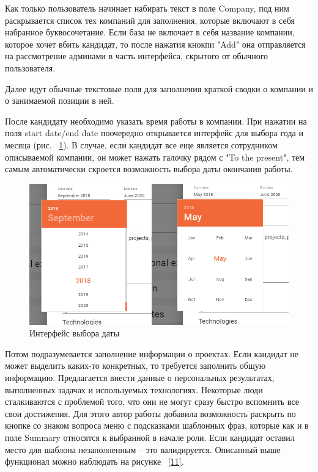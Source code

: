 \documentclass[14pt, a4paper]{diplom}
\begin{document}
Как только пользователь начинает набирать текст в поле Company, под ним раскрывается список тех компаний для заполнения, которые включают в себя набранное буквосочетание.
Если база не включает в себя название компании, которое хочет вбить кандидат, то после нажатия кнокпи "Add" она
отправляется на рассмотрение админами в часть интерфейса, скрытого от обычного пользователя.

Далее идут обычные текстовые поля для заполнения краткой сводки о компании и о занимаемой позиции в ней.

После кандидату необходимо указать время работы в компании. При нажатии на поля start date/end date поочередно открывается интерфейс для выбора года и месяца (рис. ~\ref{10}).
В случае, если кандидат все еще является сотрудником описываемой компании, он может нажать галочку рядом с "To the present", тем самым автоматически скроется возможность выбора даты окончания работы.

\begin{figure}[!ht]
\centering
\includegraphics[width=1\textwidth]{resources/dates.png}
\caption{Интерфейс выбора даты}
\label{10}
\end{figure}

Потом подразумевается заполнение информации о проектах. Если кандидат не может выделить каких-то конкретных, то требуется заполнить общую информацию. Предлагается внести данные о персональных результатах, выполненных задачах и используемых технологиях.
Некоторые люди сталкиваются с проблемой того, что они не могут сразу быстро вспомнить все свои достижения.
Для этого автор работы добавила возможность раскрыть по кнопке со знаком вопроса меню с подсказками шаблонных фраз, которые как и в поле Summary относятся к выбранной в начале роли. Если кандидат оставил место для шаблона незаполненным -- это валидируется.
Описанный выше функционал можно наблюдать на рисунке ~\ref{11}.
\end{document}
